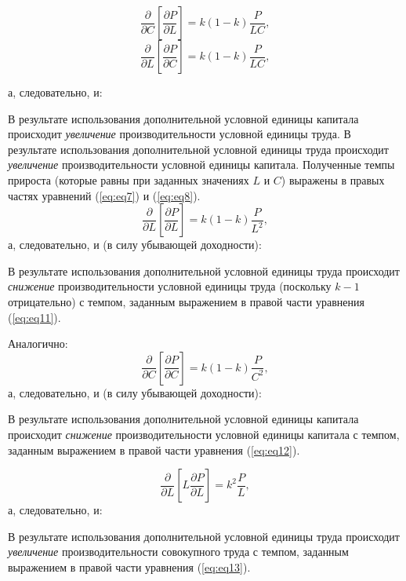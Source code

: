 \documentclass[leqno]{article}  %
\begin{document}
\begin{equation}
\frac{\partial}{\partial C}\!\left[\frac{\partial P}{\partial L}\right]=k(1-k)\frac{P}{LC},
\end{equation}
\begin{equation}
\frac{\partial}{\partial L}\!\left[\frac{\partial P}{\partial C}\right]=k(1-k)\frac{P}{LC},
\end{equation}
\par
а, следовательно, и:
\par
В результате использования дополнительной условной единицы капитала происходит \emph{увеличение} производительности условной единицы труда. В результате использования дополнительной условной единицы труда происходит \emph{увеличение} производительности условной единицы капитала. Полученные темпы прироста (которые равны при заданных значениях \(L\) и \(C\)) выражены в правых частях уравнений (\ref{eq:eq7}) и (\ref{eq:eq8}).
\begin{equation}
\label{eq:eq11}
\frac{\partial}{\partial L}\!\left[\frac{\partial P}{\partial L}\right]=k(1-k)\frac{P}{L^2},
\end{equation}
а, следовательно, и (в силу убывающей доходности):
\par
В результате использования дополнительной условной единицы труда происходит \emph{снижение} производительности условной единицы труда (поскольку \(k-1\) отрицательно) с темпом, заданным выражением в правой части уравнения (\ref{eq:eq11}).
\par
Аналогично:
\begin{equation}
\label{eq:eq12}
\frac{\partial}{\partial C}\!\left[\frac{\partial P}{\partial C}\right]=k(1-k)\frac{P}{C^2},
\end{equation}
а, следовательно, и (в силу убывающей доходности):
\par
В результате использования дополнительной условной единицы капитала происходит \emph{снижение} производительности условной единицы капитала с темпом, заданным выражением в правой части уравнения (\ref{eq:eq12}).
\par
\begin{equation}
\label{eq:eq13}
\frac{\partial}{\partial L}\!\left[L \frac{\partial P}{\partial L}\right]=k^2\frac{P}{L},
\end{equation}
а, следовательно, и:
\par
В результате использования дополнительной условной единицы труда происходит \emph{увеличение} производительности совокупного труда с темпом, заданным выражением в правой части уравнения (\ref{eq:eq13}).
\end{document}
